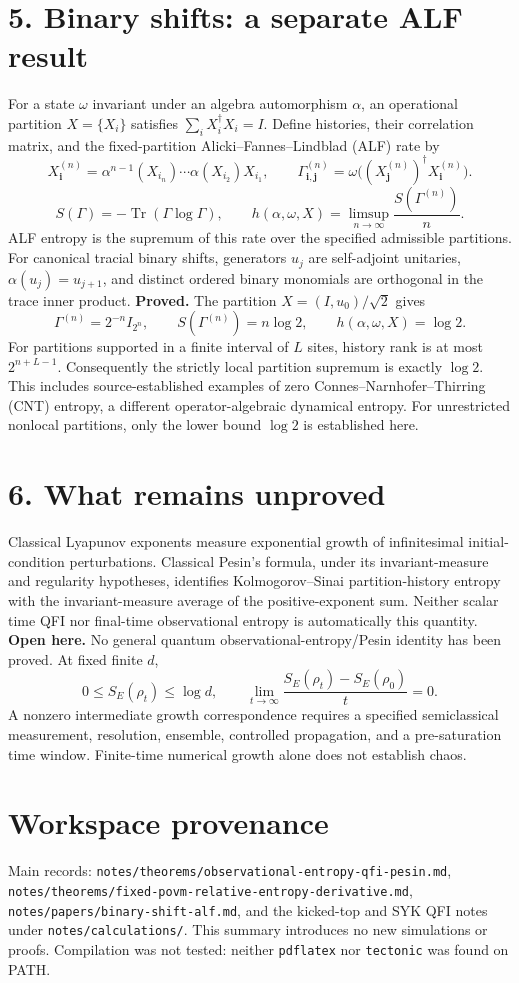 \documentclass[11pt,a4paper]{article}
\DeclareMathOperator{\Tr}{Tr}
\begin{document}
\section*{5. Binary shifts: a separate ALF result}
For a state $\omega$ invariant under an algebra automorphism $\alpha$, an operational partition $X=\{X_i\}$ satisfies $\sum_iX_i^\dagger X_i=I$. Define histories, their correlation matrix, and the fixed-partition Alicki--Fannes--Lindblad (ALF) rate by
\[X_{\boldsymbol i}^{(n)}=\alpha^{n-1}(X_{i_n})\cdots\alpha(X_{i_2})X_{i_1},\qquad \Gamma_{\boldsymbol i,\boldsymbol j}^{(n)}=\omega\bigl((X_{\boldsymbol j}^{(n)})^\dagger X_{\boldsymbol i}^{(n)}\bigr).\]
\[S(\Gamma)=-\Tr(\Gamma\log\Gamma),\qquad h(\alpha,\omega,X)=\limsup_{n\to\infty}\frac{S(\Gamma^{(n)})}{n}.\]
ALF entropy is the supremum of this rate over the specified admissible partitions. For canonical tracial binary shifts, generators $u_j$ are self-adjoint unitaries, $\alpha(u_j)=u_{j+1}$, and distinct ordered binary monomials are orthogonal in the trace inner product.
\textbf{Proved.} The partition $X=(I,u_0)/\sqrt2$ gives
\[\Gamma^{(n)}=2^{-n}I_{2^n},\qquad S(\Gamma^{(n)})=n\log2,\qquad h(\alpha,\omega,X)=\log2.\]
For partitions supported in a finite interval of $L$ sites, history rank is at most $2^{n+L-1}$. Consequently the strictly local partition supremum is exactly $\log2$. This includes source-established examples of zero Connes--Narnhofer--Thirring (CNT) entropy, a different operator-algebraic dynamical entropy. For unrestricted nonlocal partitions, only the lower bound $\log2$ is established here.

\section*{6. What remains unproved}
Classical Lyapunov exponents measure exponential growth of infinitesimal initial-condition perturbations. Classical Pesin's formula, under its invariant-measure and regularity hypotheses, identifies Kolmogorov--Sinai partition-history entropy with the invariant-measure average of the positive-exponent sum. Neither scalar time QFI nor final-time observational entropy is automatically this quantity.
\textbf{Open here.} No general quantum observational-entropy/Pesin identity has been proved. At fixed finite $d$,
\[0\leq S_E(\rho_t)\leq\log d,\qquad \lim_{t\to\infty}\frac{S_E(\rho_t)-S_E(\rho_0)}{t}=0.\]
A nonzero intermediate growth correspondence requires a specified semiclassical measurement, resolution, ensemble, controlled propagation, and a pre-saturation time window. Finite-time numerical growth alone does not establish chaos.

\section*{Workspace provenance}
\noindent Main records: \texttt{notes/theorems/observational-entropy-qfi-pesin.md}, \texttt{notes/theorems/fixed-povm-relative-entropy-derivative.md}, \texttt{notes/papers/binary-shift-alf.md}, and the kicked-top and SYK QFI notes under \texttt{notes/calculations/}. This summary introduces no new simulations or proofs. Compilation was not tested: neither \texttt{pdflatex} nor \texttt{tectonic} was found on PATH.
\end{document}
